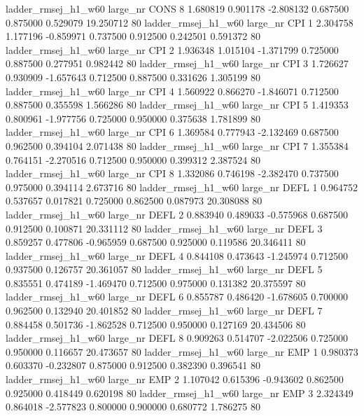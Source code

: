 ladder_rmsej_h1_w60   large_nr     CONS                 8  1.680819  0.901178  -2.808132 0.687500 0.875000  0.529079   19.250712 80
ladder_rmsej_h1_w60   large_nr      CPI                 1  2.304758  1.177196  -0.859971 0.737500 0.912500  0.242501    0.591372 80
ladder_rmsej_h1_w60   large_nr      CPI                 2  1.936348  1.015104  -1.371799 0.725000 0.887500  0.277951    0.982442 80
ladder_rmsej_h1_w60   large_nr      CPI                 3  1.726627  0.930909  -1.657643 0.712500 0.887500  0.331626    1.305199 80
ladder_rmsej_h1_w60   large_nr      CPI                 4  1.560922  0.866270  -1.846071 0.712500 0.887500  0.355598    1.566286 80
ladder_rmsej_h1_w60   large_nr      CPI                 5  1.419353  0.800961  -1.977756 0.725000 0.950000  0.375638    1.781899 80
ladder_rmsej_h1_w60   large_nr      CPI                 6  1.369584  0.777943  -2.132469 0.687500 0.962500  0.394104    2.071438 80
ladder_rmsej_h1_w60   large_nr      CPI                 7  1.355384  0.764151  -2.270516 0.712500 0.950000  0.399312    2.387524 80
ladder_rmsej_h1_w60   large_nr      CPI                 8  1.332086  0.746198  -2.382470 0.737500 0.975000  0.394114    2.673716 80
ladder_rmsej_h1_w60   large_nr     DEFL                 1  0.964752  0.537657   0.017821 0.725000 0.862500  0.087973   20.308088 80
ladder_rmsej_h1_w60   large_nr     DEFL                 2  0.883940  0.489033  -0.575968 0.687500 0.912500  0.100871   20.331112 80
ladder_rmsej_h1_w60   large_nr     DEFL                 3  0.859257  0.477806  -0.965959 0.687500 0.925000  0.119586   20.346411 80
ladder_rmsej_h1_w60   large_nr     DEFL                 4  0.844108  0.473643  -1.245974 0.712500 0.937500  0.126757   20.361057 80
ladder_rmsej_h1_w60   large_nr     DEFL                 5  0.835551  0.474189  -1.469470 0.712500 0.975000  0.131382   20.375597 80
ladder_rmsej_h1_w60   large_nr     DEFL                 6  0.855787  0.486420  -1.678605 0.700000 0.962500  0.132940   20.401852 80
ladder_rmsej_h1_w60   large_nr     DEFL                 7  0.884458  0.501736  -1.862528 0.712500 0.950000  0.127169   20.434506 80
ladder_rmsej_h1_w60   large_nr     DEFL                 8  0.909263  0.514707  -2.022506 0.725000 0.950000  0.116657   20.473657 80
ladder_rmsej_h1_w60   large_nr      EMP                 1  0.980373  0.603370  -0.232807 0.875000 0.912500  0.382390    0.396541 80
ladder_rmsej_h1_w60   large_nr      EMP                 2  1.107042  0.615396  -0.943602 0.862500 0.925000  0.418449    0.620198 80
ladder_rmsej_h1_w60   large_nr      EMP                 3  2.324349  0.864018  -2.577823 0.800000 0.900000  0.680772    1.786275 80
